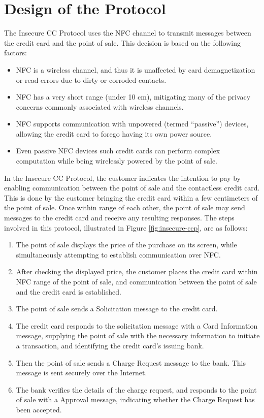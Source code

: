 \section{Design of the Protocol}
\label{sec:insecure-design}

The Insecure CC Protocol uses the NFC channel to transmit messages between the credit card and the point of sale.
This decision is based on the following factors:
\begin{itemize}
\item NFC is a wireless channel, and thus it is unaffected by card demagnetization or read errors due to dirty or corroded contacts.
\item NFC has a very short range (under 10 cm), mitigating many of the privacy concerns commonly associated with wireless channels.
\item NFC supports communication with unpowered (termed ``passive'') devices, allowing the credit card to forego having its own power source.
\item Even passive NFC devices such credit cards can perform complex computation while being wirelessly powered by the point of sale.
\end{itemize}

In the Insecure CC Protocol, the customer indicates the intention to pay by enabling communication between the point of sale and the contactless credit card.
This is done by the customer bringing the credit card within a few centimeters of the point of sale.
Once within range of each other, the point of sale may send messages to the credit card and receive any resulting responses.
The steps involved in this protocol, illustrated in Figure \ref{fig:insecure-ccp}, are as follows:

\begin{enumerate}
\item The point of sale displays the price of the purchase on its screen, while simultaneously attempting to establish communication over NFC.
\item After checking the displayed price, the customer places the credit card within NFC range of the point of sale, and communication between the point of sale and the credit card is established.
\item The point of sale sends a Solicitation message to the credit card.
\item The credit card responds to the solicitation message with a Card Information message, supplying the point of sale with the necessary information to initiate a transaction,
	and identifying the credit card's issuing bank.
\item Then the point of sale sends a Charge Request message to the bank. This message is sent securely over the Internet.
\item The bank verifies the details of the charge request, and responds to the point of sale with a Approval message, indicating whether the Charge Request has been accepted.
\end{enumerate}


